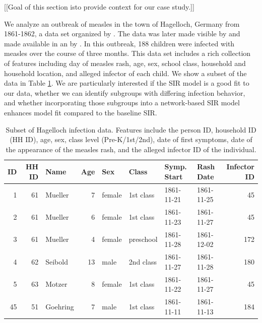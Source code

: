 \documentclass[
  shortnames]{jss}
\begin{document}
{[}{[}Goal of this section isto provide context for our case
study.{]}{]}

We analyze an outbreak of measles in the town of Hagelloch, Germany from
1861-1862, a data set organized by \cite{pfeilsticker1863}. The data was
later made visible by \cite{oesterle1992} and made available in an
 by \cite{surveillance2017}. In this outbreak, 188 children
were infected with measles over the course of three months. This data
set includes a rich collection of features including day of measles
rash, age, sex, school class, household and household location, and
alleged infector of each child. We show a subset of the data in Table
\ref{tab:hags-people}. We are particularly interested if the SIR model
is a good fit to our data, whether we can identify subgroups with
differing infection behavior, and whether incorporating those subgroups
into a network-based SIR model enhances model fit compared to the
baseline SIR.

\begin{CodeChunk}
\begin{table}[!h]

\caption{\label{tab:hags-people}Subset of Hagelloch infection data.  Features include the person ID, household ID (HH ID), age, sex, class level (Pre-K/1st/2nd), date of first symptoms, date of the appearance of the measles rash, and the alleged infector ID of the individual.}
\centering
\begin{tabular}[t]{rrlrllllr}
\toprule
ID & HH ID & Name & Age & Sex & Class & Symp. Start & Rash Date & Infector ID\\
\midrule
1 & 61 & Mueller & 7 & female & 1st class & 1861-11-21 & 1861-11-25 & 45\\
2 & 61 & Mueller & 6 & female & 1st class & 1861-11-23 & 1861-11-27 & 45\\
3 & 61 & Mueller & 4 & female & preschool & 1861-11-28 & 1861-12-02 & 172\\
4 & 62 & Seibold & 13 & male & 2nd class & 1861-11-27 & 1861-11-28 & 180\\
5 & 63 & Motzer & 8 & female & 1st class & 1861-11-22 & 1861-11-27 & 45\\
45 & 51 & Goehring & 7 & male & 1st class & 1861-11-11 & 1861-11-13 & 184\\
\bottomrule
\end{tabular}
\end{table}

\end{CodeChunk}
\end{document}
